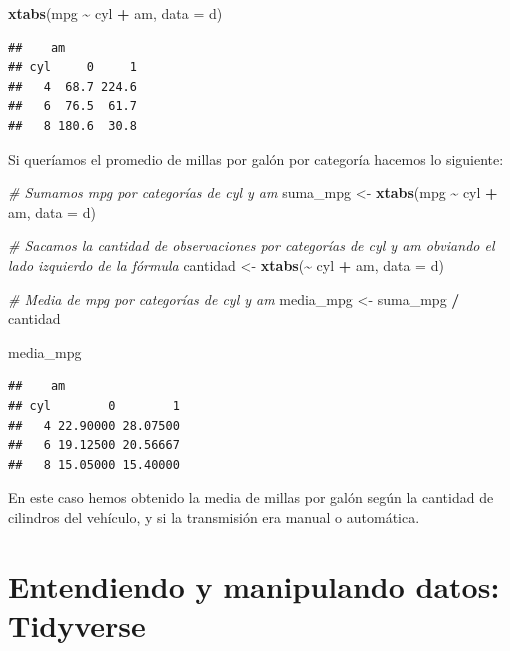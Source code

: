 \documentclass[
]{article}
\newenvironment{Shaded}{\begin{snugshade}}{\end{snugshade}}
\newcommand{\AttributeTok}[1]{\textcolor[rgb]{0.13,0.29,0.53}{#1}}
\newcommand{\CommentTok}[1]{\textcolor[rgb]{0.56,0.35,0.01}{\textit{#1}}}
\newcommand{\FunctionTok}[1]{\textcolor[rgb]{0.13,0.29,0.53}{\textbf{#1}}}
\newcommand{\NormalTok}[1]{#1}
\newcommand{\OtherTok}[1]{\textcolor[rgb]{0.56,0.35,0.01}{#1}}
\newcommand{\SpecialCharTok}[1]{\textcolor[rgb]{0.81,0.36,0.00}{\textbf{#1}}}
\begin{document}
\begin{Shaded}
\begin{Highlighting}[]
\FunctionTok{xtabs}\NormalTok{(mpg }\SpecialCharTok{\textasciitilde{}}\NormalTok{ cyl }\SpecialCharTok{+}\NormalTok{ am, }\AttributeTok{data =}\NormalTok{ d)}
\end{Highlighting}
\end{Shaded}

\begin{verbatim}
##    am
## cyl     0     1
##   4  68.7 224.6
##   6  76.5  61.7
##   8 180.6  30.8
\end{verbatim}

Si queríamos el promedio de millas por galón por categoría hacemos lo
siguiente:

\begin{Shaded}
\begin{Highlighting}[]
\CommentTok{\# Sumamos mpg por categorías de cyl y am}
\NormalTok{suma\_mpg }\OtherTok{\textless{}{-}} \FunctionTok{xtabs}\NormalTok{(mpg }\SpecialCharTok{\textasciitilde{}}\NormalTok{ cyl }\SpecialCharTok{+}\NormalTok{ am, }\AttributeTok{data =}\NormalTok{ d)}

\CommentTok{\# Sacamos la cantidad de observaciones por categorías de cyl y am obviando el lado izquierdo de la fórmula}
\NormalTok{cantidad }\OtherTok{\textless{}{-}} \FunctionTok{xtabs}\NormalTok{(}\SpecialCharTok{\textasciitilde{}}\NormalTok{ cyl }\SpecialCharTok{+}\NormalTok{ am, }\AttributeTok{data =}\NormalTok{ d)}

\CommentTok{\# Media de mpg por categorías de cyl y am}
\NormalTok{media\_mpg }\OtherTok{\textless{}{-}}\NormalTok{ suma\_mpg }\SpecialCharTok{/}\NormalTok{ cantidad}

\NormalTok{media\_mpg}
\end{Highlighting}
\end{Shaded}

\begin{verbatim}
##    am
## cyl        0        1
##   4 22.90000 28.07500
##   6 19.12500 20.56667
##   8 15.05000 15.40000
\end{verbatim}

En este caso hemos obtenido la media de millas por galón según la
cantidad de cilindros del vehículo, y si la transmisión era manual o
automática.

\section{Entendiendo y manipulando datos:
Tidyverse}\label{entendiendo-y-manipulando-datos-tidyverse}
\end{document}
